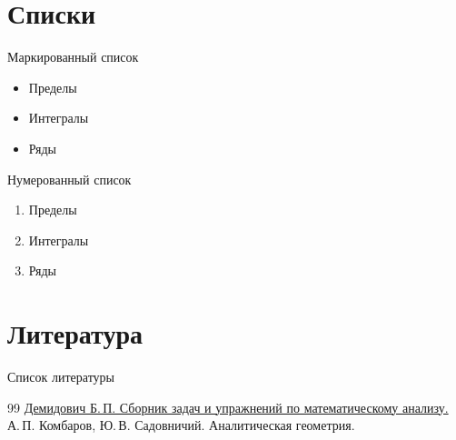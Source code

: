 \documentclass[12pt]{beamer}
\begin{document}
\section{Списки}

\begin{frame}{Маркированный список}
\begin{itemize}
\item Пределы
\item Интегралы
\item Ряды
\end{itemize}
\end{frame}

\begin{frame}{Нумерованный список}
\begin{enumerate}
\item Пределы
\item Интегралы
\item Ряды
\end{enumerate}
\end{frame}

\section{Литература}
\begin{frame}{Список литературы}
\begin{thebibliography}{99}
 \href{https://kvm.gubkin.ru/pub/uok/Demidovich.pdf}{Демидович Б.\,П. Сборник задач и упражнений по математическому анализу.}
 А.\,П. Комбаров, Ю.\,В. Садовничий. Аналитическая геометрия. 
\end{thebibliography}
\end{frame}
\end{document}
